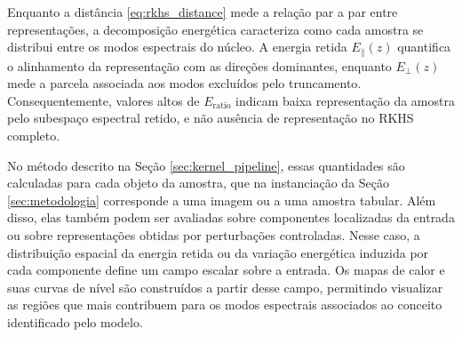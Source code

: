 \begin{remark}\label{rem:diagnostic}
Enquanto a distância \eqref{eq:rkhs_distance} mede a relação par a par entre representações, a decomposição energética caracteriza como cada amostra se distribui entre os modos espectrais do núcleo. A energia retida $E_\parallel(z)$ quantifica o alinhamento da representação com as direções dominantes, enquanto $E_\perp(z)$ mede a parcela associada aos modos excluídos pelo truncamento. Consequentemente, valores altos de $E_{\mathrm{ratio}}$ indicam baixa representação da amostra pelo subespaço espectral retido, e não ausência de representação no RKHS completo.

No método descrito na Seção \ref{sec:kernel_pipeline}, essas quantidades são calculadas para cada objeto da amostra, que na instanciação da Seção \ref{sec:metodologia} corresponde a uma imagem ou a uma amostra tabular. Além disso, elas também podem ser avaliadas sobre componentes localizadas da entrada ou sobre representações obtidas por perturbações controladas. Nesse caso, a distribuição espacial da energia retida ou da variação energética induzida por cada componente define um campo escalar sobre a entrada. Os mapas de calor e suas curvas de nível são construídos a partir desse campo, permitindo visualizar as regiões que mais contribuem para os modos espectrais associados ao conceito identificado pelo modelo.
\end{remark}